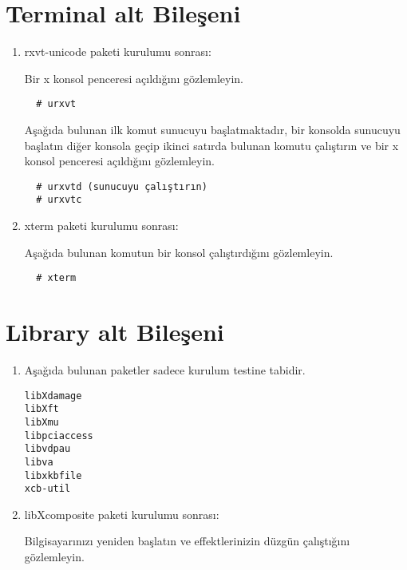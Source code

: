 \documentclass[a4paper,10pt]{article}
\begin{document}
\section{Terminal alt Bileşeni}
\begin{enumerate}
  \item rxvt-unicode paketi kurulumu sonrası:

  Bir x konsol penceresi açıldığını gözlemleyin.
  \begin{verbatim}
  # urxvt
  \end{verbatim}

  Aşağıda bulunan ilk komut sunucuyu başlatmaktadır, bir konsolda sunucuyu başlatın diğer konsola geçip ikinci satırda bulunan komutu çalıştırın ve bir x konsol penceresi açıldığını gözlemleyin.
  \begin{verbatim}
  # urxvtd (sunucuyu çalıştırın)
  # urxvtc
  \end{verbatim}

  \item xterm paketi kurulumu sonrası:

  Aşağıda bulunan komutun bir konsol çalıştırdığını gözlemleyin.
  \begin{verbatim}
  # xterm
  \end{verbatim}
\end{enumerate}
\section{Library alt Bileşeni}
\begin{enumerate}
 \item Aşağıda bulunan paketler sadece kurulum testine tabidir.
  \begin{verbatim}
libXdamage
libXft
libXmu
libpciaccess
libvdpau
libva
libxkbfile
xcb-util
  \end{verbatim}

\item libXcomposite paketi kurulumu sonrası:

Bilgisayarınızı yeniden başlatın ve effektlerinizin düzgün çalıştığını gözlemleyin.

\end{enumerate}
\end{document}
